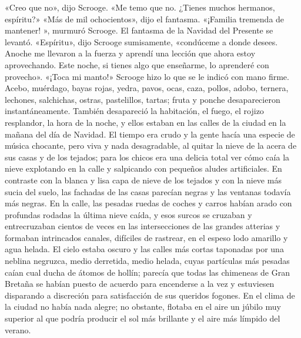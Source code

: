 \documentclass{novela}
\begin{document}
 «Creo que no», dijo Scrooge. «Me temo que no. ¿Tienes muchos hermanos, espíritu?»
 «Más de mil ochocientos», dijo el fantasma.
 «¡Familia tremenda de mantener! », murmuró Scrooge.
 El fantasma de la Navidad del Presente se levantó.
 «Espíritu», dijo Scrooge sumisamente, «condúceme a donde desees. Anoche me llevaron a la fuerza y aprendí una lección que ahora estoy aprovechando. Este noche, si tienes algo que enseñarme, lo aprenderé con provecho».
 «¡Toca mi manto!»
 Scrooge hizo lo que se le indicó con mano firme.
 Acebo, muérdago, bayas rojas, yedra, pavos, ocas, caza, pollos, adobo, ternera, lechones, salchichas, ostras, pastelillos, tartas; fruta y ponche desaparecieron instantáneamente. También desapareció la habitación, el fuego, el rojizo resplandor, la hora de la noche, y ellos estaban en las calles de la ciudad en la mañana del día de Navidad. El tiempo era crudo y la gente hacía una especie de música chocante, pero viva y nada desagradable, al quitar la nieve de la acera de sus casas y de los tejados; para los chicos era una delicia total ver cómo caía la nieve explotando en la calle y salpicando con pequeños aludes artificiales.
 En contraste con la blanca y lisa capa de nieve de los tejados y con la nieve más sucia del suelo, las fachadas de las casas parecían negras y las ventanas todavía más negras. En la calle, las pesadas ruedas de coches y carros habían arado con profundas rodadas la última nieve caída, y esos surcos se cruzaban y entrecruzaban cientos de veces en las intersecciones de las grandes atterias y formaban intrincados canales, difíciles de rastrear, en el espeso lodo amarillo y agua helada. El cielo estaba oscuro y las calles más cortas taponadas por una neblina negruzca, medio derretida, medio helada, cuyas partículas más pesadas caían cual ducha de átomos de hollín; parecía que todas las chimeneas de Gran Bretaña se habían puesto de acuerdo para encenderse a la vez y estuviesen disparando a discreción para satisfacción de sus queridos fogones. En el clima de la ciudad no había nada alegre; no obstante, flotaba en el aire un júbilo muy superior al que podría producir el sol más brillante y el aire más límpido del verano.
\end{document}

